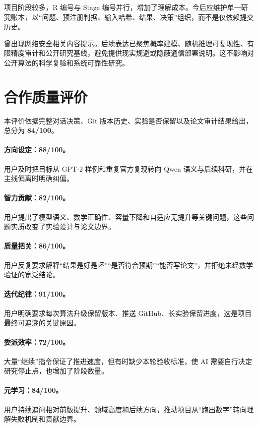 \documentclass[12pt,a4paper]{article}
\begin{document}
项目阶段较多，R 编号与 Stage 编号并行，增加了理解成本。今后应维护单一研究账本，以“问题、预注册判据、输入哈希、结果、决策”组织，而不是仅依赖提交历史。

曾出现网络安全相关内容提示。后续表达已聚焦概率建模、随机推理可复现性、有限精度审计和公开研究基线，避免提供现实规避或隐蔽通信部署说明。这不影响对公开算法的科学复验和系统可靠性研究。

\section{合作质量评价}

本评价依据完整对话决策、Git 版本历史、实验是否保留以及论文审计结果给出，总分为 \textbf{84/100}。

\paragraph{方向设定：88/100。} 用户及时把目标从 GPT-2 样例和重复官方复现转向 Qwen 语义与后续科研，并在主线偏离时明确纠偏。

\paragraph{智力贡献：82/100。} 用户提出了模型语义、数学正确性、容量下降和自适应无提升等关键问题，这些问题实质改变了实验设计与论文边界。

\paragraph{质量把关：86/100。} 用户反复要求解释“结果是好是坏”“是否符合预期”“能否写论文”，并拒绝未经数学验证的宽泛结论。

\paragraph{迭代纪律：91/100。} 用户明确要求每次算法升级保留版本、推送 GitHub、长实验保留进度，这是项目最终可追溯的关键原因。

\paragraph{委派效率：72/100。} 大量“继续”指令保证了推进速度，但有时缺少本轮验收标准，使 AI 需要自行决定研究停止点，也增加了阶段数量。

\paragraph{元学习：84/100。} 用户持续追问相对前版提升、领域高度和后续方向，推动项目从“跑出数字”转向理解失败机制和贡献边界。
\end{document}
